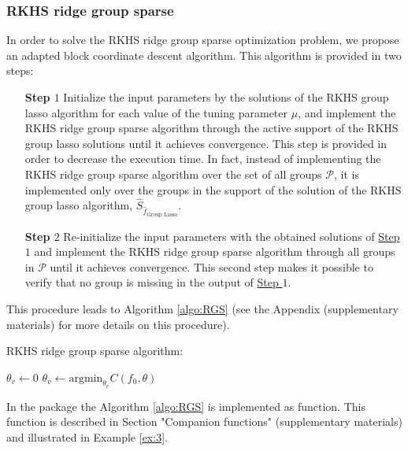 \subsubsection{RKHS ridge group sparse}\label{subsec:optimRGS} 
In order to solve the RKHS ridge group sparse optimization problem, we propose an adapted block coordinate descent algorithm. This algorithm is provided in two steps:
\begin{itemize}
\item[\textbf{Step $1$}]\label{step1} Initialize the input parameters by the solutions of the RKHS group lasso algorithm for each value of the tuning parameter $\mu$, and implement the RKHS ridge group sparse algorithm through the active support of the RKHS group lasso solutions until it achieves convergence.
This step is provided in order to decrease the execution time. In fact, instead of implementing the RKHS ridge group sparse algorithm over the set of all groups $\mathcal{P}$, it is implemented only over the groups in the support of the solution of the RKHS group lasso algorithm, $\widehat{S}_{\widehat{f}_{\text{Group Lasso}}}$. 
\item[\textbf{Step $2$}]\label{step2} Re-initialize the input parameters with the obtained solutions of \hyperref[step1]{Step $1$} and implement the RKHS ridge group sparse algorithm through all groups in $\mathcal{P}$ until it achieves convergence. 
This second step makes it possible to verify that no group is missing in the output of \hyperref[step1]{Step $1$}.
\end{itemize}
This procedure leads to Algorithm \ref{algo:RGS} (see the Appendix (supplementary materials) for more details on this procedure). 
\begin{algorithm}[h!]
\caption{RKHS ridge group sparse algorithm:}\label{algo:RGS}
\small{
{\setlength{\tabcolsep}{4pt}
\begin{algorithmic}[1]
\Repeat
      \State $\theta_v\gets 0$
    \Else
      \State$\theta_v\gets\text{argmin}_{\theta_v}C(f_0,\theta)$
    \EndIf 
 \EndFor
{}

\end{algorithmic}}}
\end{algorithm}
In the  package the Algorithm \ref{algo:RGS} is implemented as  function. This function is described in Section "Companion functions" (supplementary materials) and illustrated in Example \ref{ex:3}.
